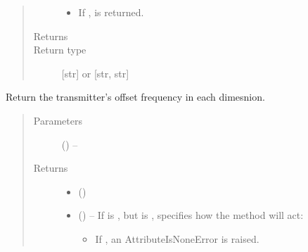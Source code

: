 \documentclass[letterpaper,10pt,english]{sphinxmanual}
\begin{document}
\begin{fulllineitems}
\begin{fulllineitems}
\begin{quote}
\begin{description}
\begin{itemize}
\item {} 
\sphinxAtStartPar
If ,  is returned.

\end{itemize}


\item[{Returns}] \leavevmode
\sphinxAtStartPar
{}

\item[{Return type}] \leavevmode
\sphinxAtStartPar
{[}str{]} or {[}str, str{]}

\end{description}\end{quote}

\end{fulllineitems}


\begin{fulllineitems}
\label{\detokenize{references/core:nmrespy.core.Estimator.get_offset}}
\sphinxAtStartPar
Return the transmitter’s offset frequency in each dimesnion.
\begin{quote}\begin{description}
\item[{Parameters}] \leavevmode
\sphinxAtStartPar
{} (\sphinxstyleliteralemphasis{\sphinxupquote{, }}) – 

\item[{Returns}] \leavevmode
\sphinxAtStartPar
\begin{itemize}
\item {} 
\sphinxAtStartPar
{} ()

\item {} 
\sphinxAtStartPar
{} () – If  is , but  is ,  specifies
how the method will act:
\begin{itemize}
\item {} 
\sphinxAtStartPar
If , an AttributeIsNoneError is raised.


\end{itemize}
\end{itemize}
\end{description}
\end{quote}
\end{fulllineitems}
\end{fulllineitems}
\end{document}
